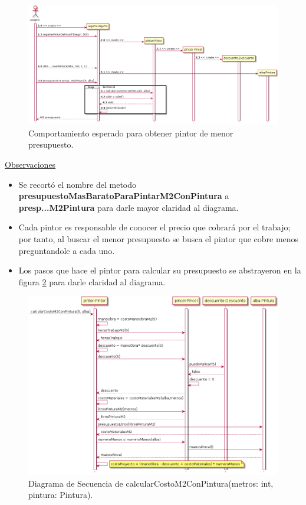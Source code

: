 \documentclass[titlepage,a4paper]{article}
\begin{document}
\begin{figure}[H]
\centering
\includegraphics[width= 1.1\textwidth]{diagrama_secuencia01.png} 
\caption{\label{fig:seq01}Comportamiento esperado para obtener pintor de menor presupuesto.}
\end{figure}

\underline{Observaciones}
\begin{itemize}
  \item Se recortó el nombre del metodo \textbf{presupuestoMasBaratoParaPintarM2ConPintura}  a  \textbf{presp...M2Pintura} para darle mayor claridad al diagrama.
  \item Cada pintor es responsable de conocer el precio que cobrará por el trabajo; por tanto, al buscar el menor presupuesto se busca el pintor que cobre menos preguntandole a cada uno.
  \item Los pasos que hace el pintor para calcular su presupuesto se abstrayeron en la figura \ref{fig:seq02} para darle claridad al diagrama.
\end{itemize}

\begin{figure}[H]
\centering
\includegraphics[width=\textwidth]{diagrama_secuencia02.png}
\caption{\label{fig:seq02} Diagrama de Secuencia de calcularCostoM2ConPintura(metros: int, pintura: Pintura).}
\end{figure}
\end{document}

